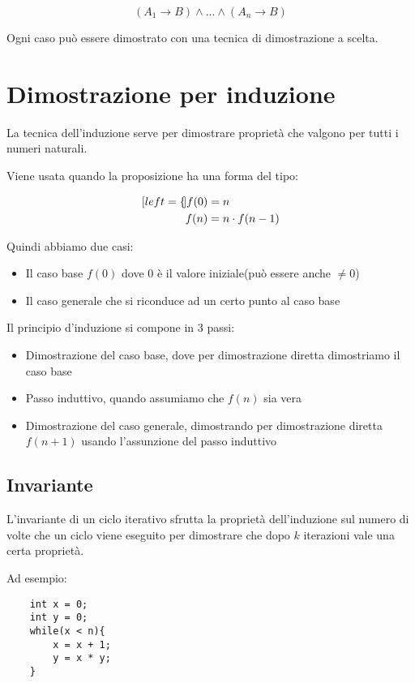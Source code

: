 \documentclass[a4paper]{article}
\begin{document}
$$(A_1 \rightarrow B) \land ... \land (A_n \rightarrow B)$$

Ogni caso può essere dimostrato con una tecnica di dimostrazione a scelta.

\section{Dimostrazione per induzione}

La tecnica dell'induzione serve per dimostrare proprietà che valgono per tutti i numeri naturali.

Viene usata quando la proposizione ha una forma del tipo:

\begin{alignat*}{4}[left = \empheqlbrace]
	f(0) & =n \\
	f(n) & = n \cdot f(n-1)
\end{alignat*}

Quindi abbiamo due casi: \begin{itemize}
	\item Il caso base $f(0)$ dove 0 è il valore iniziale(può essere anche $\neq 0$)
	\item Il caso generale che si riconduce ad un certo punto al caso base
\end{itemize}

Il principio d'induzione si compone in 3 passi:

\begin{itemize}
	\item Dimostrazione del caso base, dove per dimostrazione diretta dimostriamo il caso base
	\item Passo induttivo, quando assumiamo che $f(n)$ sia vera
	\item Dimostrazione del caso generale, dimostrando per dimostrazione diretta $f(n+1)$ usando l'assunzione del passo induttivo
\end{itemize}

\subsection{Invariante}

L'invariante di un ciclo iterativo sfrutta la proprietà dell'induzione sul numero di volte che un ciclo viene eseguito per dimostrare che dopo $k$ iterazioni vale una certa proprietà.

Ad esempio:

\begin{lstlisting}
	int x = 0;
	int y = 0;
	while(x < n){
		x = x + 1;
		y = x * y;
	}
\end{lstlisting}
\end{document}
